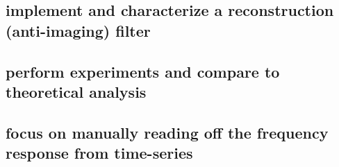 \documentclass{article}
\begin{document}
\subsection{implement and characterize a reconstruction (anti-imaging) filter}
\label{sec:orgdf52bce}

\subsection{perform experiments and compare to theoretical analysis}
\label{sec:org09205ed}

\subsection{focus on manually reading off the frequency response from time-series}
\label{sec:orge9e1795}
\end{document}
